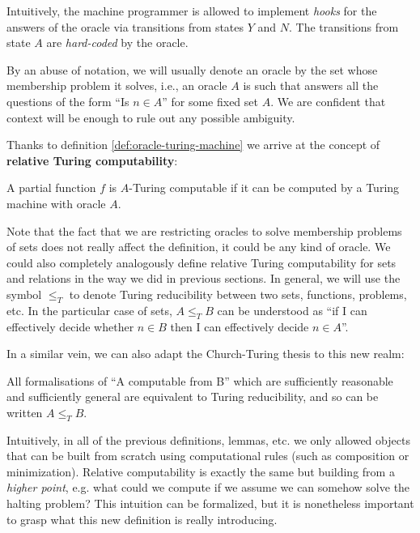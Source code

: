 \documentclass[../main.tex]{memoir}
\begin{document}
\begin{remark}
  Intuitively, the machine programmer is allowed to implement \textit{hooks} for the answers of the oracle via transitions from states $Y$ and $N$. The transitions from state $A$ are \textit{hard-coded} by the oracle.
\end{remark}

By an abuse of notation, we will usually denote an oracle by the set whose membership problem it solves, i.e., an oracle $A$ is such that answers all the questions of the form ``Is $n \in A$'' for some fixed set $A$. We are confident that context will be enough to rule out any possible ambiguity.

Thanks to definition \ref{def:oracle-turing-machine} we arrive at the concept of \textbf{relative Turing computability}:

\begin{definition}
  A partial function $f$ is $A$-Turing computable if it can be computed by a Turing machine with oracle $A$.
\end{definition}

Note that the fact that we are restricting oracles to solve membership problems of sets does not really affect the definition, it could be any kind of oracle. We could also completely analogously define relative Turing computability for sets and relations in the way we did in previous sections. In general, we will use the symbol $\le_T$ to denote Turing reducibility between two sets, functions, problems, etc. In the particular case of sets, $A \le_T B$ can be understood as ``if I can effectively decide whether $n \in B$ then I can effectively decide $n \in A$''.

In a similar vein, we can also adapt the Church-Turing thesis to this new realm:

\begin{definition}
  All formalisations of ``A computable from B'' which are sufficiently reasonable and sufficiently general are equivalent to Turing reducibility, and so can be written $A \le_T B$.
\end{definition}

Intuitively, in all of the previous definitions, lemmas, etc. we only allowed objects that can be built from scratch using computational rules (such as composition or minimization). Relative computability is exactly the same but building from a \textit{higher point}, e.g. what could we compute if we assume we can somehow solve the halting problem? This intuition can be formalized, but it is nonetheless important to grasp what this new definition is really introducing.
\end{document}
